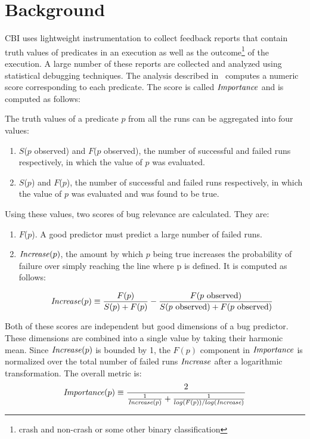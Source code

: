 
\section{Background}
\label{sec-bground}
CBI uses lightweight instrumentation to collect feedback reports that contain truth values of predicates in an execution as well as the outcome{\footnote{crash and non-crash or some other binary classification}} of the execution.  A large number of these reports are collected and analyzed using statistical debugging techniques.  The analysis described in~\cite{Liblit:2005:SSBI} computes a numeric score corresponding to each predicate.  The score is called $\mathit{Importance}$ and is computed as follows:

The truth values of a predicate $p$ from all the runs can be aggregated into four values:

\begin{enumerate}
\item $S$($p$ observed) and $F$($p$ observed), the number of successful and failed runs respectively, in which the value of $p$ was evaluated.
\item $S$($p$) and $F$($p$), the number of successful and failed runs respectively, in which the value of $p$ was evaluated and was found to be true.
\end{enumerate}

Using these values, two scores of bug relevance are calculated.  They are:
\begin{enumerate}
\item $F$($p$).  A good predictor must predict a large number of failed runs.
\item $\mathit{Increase}(p)$, the amount by which $p$ being true increases the probability of failure over simply reaching the line where p is defined.  It is computed as follows:

\begin{equation}
\label{eqn1}
\mathit{Increase}(p) \equiv
\frac{F(p)}{S(p) + F(p)}
-
\frac{F(\text{$p$ observed})}{S(\text{$p$ observed}) +
  F(\text{$p$ observed})}
\end{equation}
\end{enumerate}

Both of these scores are independent but good dimensions of a bug predictor.  These dimensions are combined into a single value by taking their harmonic mean.  Since $\mathit{Increase}(p)$ is bounded by 1, the $F(p)$ component in $\mathit{Importance}$ is normalized over the total number of failed runs $\mathit{Increase}$ after a logarithmic transformation.  The overall metric is:
\begin{equation}
\label{eqn2}
\mathit{Importance}(p) \equiv
\frac{2}{
  \frac{1}{\mathit{Increase}(p)}
  +
  \frac{1}{log(F(p)) / log(\mathit{Increase})}}
\end{equation}

